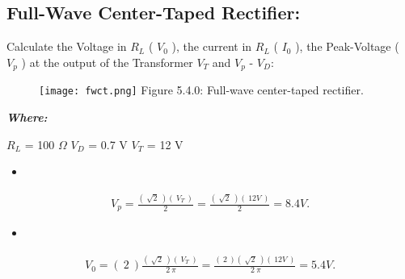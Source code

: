 \subsection{Full-Wave Center-Taped Rectifier:}

Calculate the Voltage in $R_{L}$ ( $V_{0}$ ), the current in $R_{L}$ ( $I_{0}$ ), the Peak-Voltage ( $V_{p}$ ) at the output of the Transformer $V_{T}$ and $V_{p}$ - $V_{D}$:

\begin{figure}[H]
\texttt{[image: fwct.png]}
\centering \linebreak \linebreak Figure 5.4.0: Full-wave center-taped rectifier.
\end{figure}

{\bfseries\itshape Where:
\begin{tasks}
\task $R_{L}$ = 100 $\Omega$
\task $V_{D}$ = 0.7 V
\task $V_{T}$ = 12 V
\end{tasks}} \hfill

{\bfseries\itshape\color{Maroon}{Solution:}} \hfill \break

\begin{itemize}
\item {\bfseries\itshape\color{Violet}{For peak voltage at the transformer output:}} \hfill \break
{\bfseries\itshape{}}
\end{itemize}

\begin{ceqn}
\begin{align}
V_{p} = \frac{(\ \sqrt{2}\ )(\ V_{T}\ )}{2} = \frac{(\ \sqrt{2}\ )(\ 12 V\ )}{2} = 8.4 V.
\end{align}
\end{ceqn}

\begin{itemize}
\item {\bfseries\itshape{}} \hfill \break
{\bfseries\itshape{}}
\end{itemize}

\begin{ceqn}
\begin{align}
V_{0} = (\ 2\ )\frac{(\ \sqrt{2}\ )(\ V_{T}\ )}{\ 2\ \pi} = \frac{(\ 2\ )(\ \sqrt{2}\ )(\ 12 V\ )}{\ 2\ \pi} = 5.4 V.
\end{align}
\end{ceqn}

